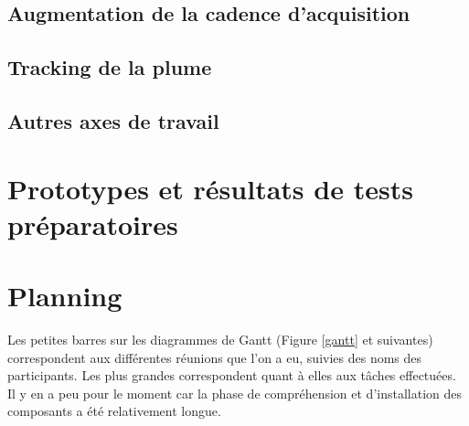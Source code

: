 \documentclass{article}
\begin{document}
\subsection{Augmentation de la cadence d'acquisition}



\subsection{Tracking de la plume}



\subsection{Autres axes de travail}



\section{Prototypes et résultats de tests préparatoires}



\section{Planning}

Les petites barres sur les diagrammes de Gantt (Figure \ref{gantt} et suivantes) correspondent aux différentes réunions que l'on a eu, suivies des noms des participants. Les plus grandes correspondent quant à elles aux tâches effectuées. Il y en a peu pour le moment car la phase de compréhension et d'installation des composants a été relativement longue.

\newpage
\end{document}
